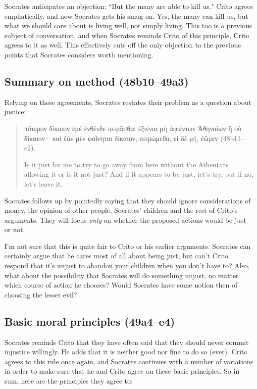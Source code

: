 \documentclass[11pt]{article}
\begin{document}
Socrates anticipates an objection: ``But the many are able to kill us." Crito agrees emphatically, and now Socrates gets his smug on. Yes, the many can kill us, but what we should care about is living well, not simply living.  This too is a previous subject of conversation, and when Socrates reminds Crito of this principle, Crito agrees to it as well.  This effectively cuts off the only objection to the previous points that Socrates considers worth mentioning.

\subsection{Summary on method (48b10--49a3)}

Relying on these agreements, Socrates restates their problem as a question about justice:

\begin{quote}
    πότερον δίκαιον ἐμὲ ἐνθένδε πειρᾶσθαι ἐξιέναι μὴ ἀφιέντων Ἀθηναίων ἢ οὐ δίκαιον· καὶ ἐὰν μὲν φαίνηται δίκαιον, πειρώμεθα, εἰ δὲ μή, ἐῶμεν (48b11--c2).

    Is it just for me to try to go away from here without the Athenians allowing it or is it not just? And if it appears to be just, let's try, but if no, let's leave it.
\end{quote}

Socrates follows up by pointedly saying that they should ignore considerations of money, the opinion of other people, Socrates' children and the rest of Crito's arguments.  They will focus \emph{only} on whether the proposed actions would be just or not.

I'm not sure that this is quite fair to Crito or his earlier arguments.  Socrates can certainly argue that he cares most of all about being just, but can't Crito respond that it's unjust to abandon your children when you don't have to?  Also, what about the possibility that Socrates will do something unjust, no matter which course of action he chooses?  Would Socrates have some notion then of choosing the lesser evil?

\subsection{Basic moral principles (49a4--e4)}

Socrates reminds Crito that they have often said that they should never commit injustice willingly.  He adds that it is neither good nor fine to do so (ever).  Crito agrees to this rule once again, and Socrates continues with a number of variations in order to make sure that he and Crito agree on these basic principles.  So in sum, here are the principles they agree to:
\end{document}
